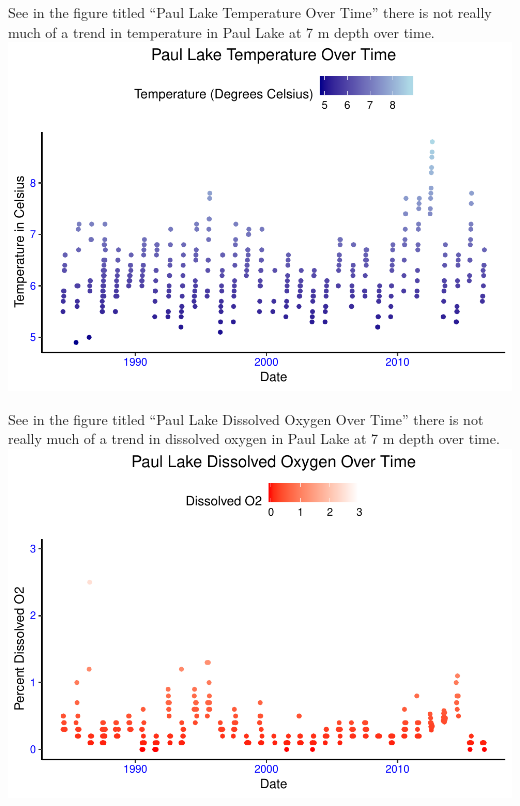 \documentclass[12pt,]{article}
\begin{document}
See in the figure titled ``Paul Lake Temperature Over Time'' there is
not really much of a trend in temperature in Paul Lake at 7 m depth over
time.
\includegraphics{KeithBollt_ENV872_FinalProject_files/figure-latex/visualization3-1.pdf}

See in the figure titled ``Paul Lake Dissolved Oxygen Over Time'' there
is not really much of a trend in dissolved oxygen in Paul Lake at 7 m
depth over time.
\includegraphics{KeithBollt_ENV872_FinalProject_files/figure-latex/visualization4-1.pdf}
\end{document}
